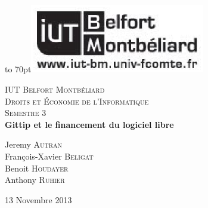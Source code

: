 \documentclass[12pt]{report}
\begin{document}
{
\begin{titlepage}

\vbox to 70pt{\hfill\includegraphics[height=3cm]{images/logo-iut.eps}}\
\begin{center}

\textsc{\LARGE IUT Belfort Montbéliard}\\[1.5cm]

\textsc{\Large Droits et Économie de l'Informatique}\\[0.5cm]
\textsc{\Large Semestre 3}\\[5cm]


{ \huge \bfseries Gittip et le financement du logiciel libre}\\[5cm]

\begin{large}
Jeremy \textsc{Autran}\\[0.3em]
François-Xavier \textsc{Beligat}\\[0.3em]
Benoit \textsc{Houdayer}\\[0.3em]
Anthony \textsc{Ruhier}\\[0.3em]
\end{large}

\vfill

{\large 13 Novembre 2013}

\end{center}
\end{titlepage}
}

{\clearpage\mbox{}\thispagestyle{empty}\clearpage}
\setcounter{page}{1}

{\large{}}


%







%


\tableofcontents
{}

%
%
\end{document}
